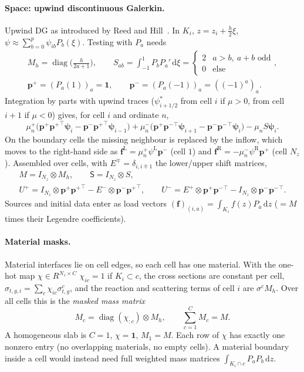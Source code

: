 \documentclass[11pt,a4paper]{article}
\newcommand{\dd}{\mathrm{d}}
\newcommand{\kron}{\otimes}
\newcommand{\pp}{{\bm{p}^{+}}}
\newcommand{\pmn}{{\bm{p}^{-}}}
\newcommand{\diag}{\operatorname{diag}}
\begin{document}
\paragraph{Space: upwind discontinuous Galerkin.} Upwind DG as introduced by Reed and Hill~\cite{ReedHill}. In $K_i$, $z=z_i+\frac h2\xi$, $\psi\approx\sum_{b=0}^p\psi_{ib}P_b(\xi)$. Testing with $P_a$ needs
\begin{gather}
M_h=\diag\Big(\frac{h}{2a+1}\Big),\qquad
S_{ab}=\int_{-1}^1P_bP_a'\,\dd\xi=\begin{cases}2&a>b,\ a+b\text{ odd}\\0&\text{else}\end{cases},\\
\pp=(P_a(1))_a=\bm 1,\qquad \pmn=(P_a(-1))_a=((-1)^a)_a .
\end{gather}
Integration by parts with upwind traces ($\psi^*_{i+1/2}$ from cell $i$ if $\mu>0$, from cell $i+1$ if $\mu<0$) gives, for cell $i$ and ordinate $n$,
\begin{equation}
\mu_n^+\big(\pp\pp^{\!\top}\bm\psi_i-\pmn\pp^{\!\top}\bm\psi_{i-1}\big)
+\mu_n^-\big(\pp\pmn^{\!\top}\bm\psi_{i+1}-\pmn\pmn^{\!\top}\bm\psi_i\big)-\mu_nS\bm\psi_i .
\end{equation}
On the boundary cells the missing neighbour is replaced by the inflow, which moves to the right-hand side as $\bm f^{\mathrm L}=\mu_n^+\psi^{\mathrm L}\pmn$ (cell $1$) and $\bm f^{\mathrm R}=-\mu^-_n\psi^{\mathrm R}\pp$ (cell $N_z$). Assembled over cells, with $E^\mp = \delta_{i,i\mp 1}$ the lower/upper shift matrices,
\begin{gather}
M=I_{N_z}\kron M_h,\qquad \mathsf S=I_{N_z}\kron S,\\
U^+=I_{N_z}\kron\pp\pp^{\!\top}-E^-\kron\pmn\pp^{\!\top},\qquad
U^-=E^+\kron\pp\pmn^{\!\top}-I_{N_z}\kron\pmn\pmn^{\!\top}.
\end{gather}
Sources and initial data enter as load vectors $(\bm f)_{(i,a)}=\int_{K_i}f(z)P_a\,\dd z$ ($=M$ times their Legendre coefficients).

\paragraph{Material masks.} Material interfaces lie on cell edges, so each cell has one material. With the one-hot map $\chi \in R^{N_z\times C}$ $\chi_{ic}=1$ if $K_i\subset c$, the cross sections are constant per cell, $\sigma_{t,g,i}=\sum_c\chi_{ic}\sigma^c_{t,g}$, and the reaction and scattering terms of cell $i$ are $\sigma^cM_h$. Over all cells this is the \emph{masked mass matrix}
\begin{equation}
M_c=\diag(\chi_{:c})\kron M_h,\qquad \sum_{c=1}^CM_c=M .
\label{eq:Mc}
\end{equation}
A homogeneous slab is $C=1$, $\chi=\bm 1$, $M_1=M$. Each row of $\chi$ has exactly one nonzero entry (no overlapping materials, no empty cells). A material boundary inside a cell would instead need full weighted mass matrices $\int_{K_i\cap c}P_aP_b\,\dd z$.
\end{document}

